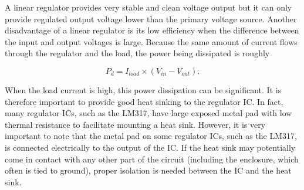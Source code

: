 \documentclass[letterpaper, 11pt]{article}
\begin{document}
A linear regulator provides very stable and clean voltage output but it can only provide regulated output voltage lower than the primary voltage source. Another disadvantage of a linear regulator is its low efficiency when the difference between the input and output voltages is large. Because the same amount of current flows through the regulator and the load, the power being dissipated is roughly

\begin{equation}
	P_d=I_{load} \times \left( V_{in}-V_{out}\right).
\end{equation}

When the load current is high, this power dissipation can be significant. It is therefore important to provide good heat sinking to the regulator IC. In fact, many regulator ICs, such as the LM317, have large exposed metal pad with low thermal resistance to facilitate mounting a heat sink.  However, it is very important to note that the metal pad on some regulator ICs, such as the LM317, is connected electrically to the output of the IC. If the heat sink may potentially come in contact with any other part of the circuit (including the enclosure, which often is tied to ground), proper isolation is needed between the IC and the heat sink. 
%
\end{document}
